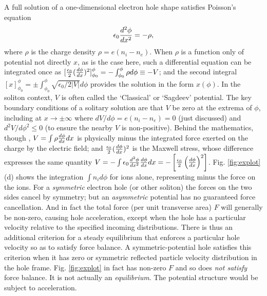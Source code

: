 \documentclass[12pt]{article}
\begin{document}
A full solution of a one-dimensional electron hole shape satisfies
Poisson's equation
\begin{equation}
  \label{eq:poisson}
  \epsilon_0{d^2\phi\over dx^2} = -\rho,
\end{equation}
where $\rho$ is the charge density $\rho=e(n_i-n_e)$. When $\rho$ is a
function only of potential not directly $x$, as is the case here, such
a differential equation can be integrated once as
$[{\epsilon_0\over 2}({d\phi\over
  dx})^2]_{\phi_0}^\phi=-\int_{\phi_0}^\phi\rho d\phi\equiv-V$; and
the second integral
$[x]_{\phi_0}^\phi=\pm\int_{\phi_0}^\phi \sqrt{\epsilon_0/2|V|}d\phi$
provides the solution in the form $x(\phi)$. In the soliton context,
$V$ is often called the `Classical' or `Sagdeev' potential. The key
boundary conditions of a solitary solution are that $V$ be zero at the
extrema of $\phi$, including at $x\to\pm \infty$ where
$dV/d\phi=e(n_i-n_e)=0$ (just discussed) and $d^2V/d\phi^2\le 0$ (to
ensure the nearby $V$ is non-positive). Behind the mathematics, though
\cite{Andrews1971a}, $V=\int\rho{d\phi\over dx}dx$ is
physically minus the integrated force exerted on the charge by the
electric field; and ${\epsilon_0\over 2}({d\phi\over dx})^2$ is the
Maxwell stress, whose difference expresses the same quantity
$V = -\int\epsilon_0{d^2\phi\over dx^2}{d\phi\over
  dx}dx=-\left[{\epsilon_0\over2}\left(d\phi\over dx\right)^2\right]
$. Fig. \ref{fig:explot}(d) shows the integration $\int n_id\phi$ for
ions alone, representing minus the force on the ions.  For a
\emph{symmetric} electron hole (or other soliton) the forces on the
two sides cancel by symmetry; but an \emph{asymmetric} potential has
no guaranteed force cancellation. And in fact the total force (per
unit transverse area) $F$ will generally be non-zero, causing hole
acceleration, except when the hole has a particular velocity relative
to the specified incoming distributions.  There is thus an additional
criterion for a steady equilibrium that enforces a particular hole
velocity so as to satisfy force balance. A symmetric-potential hole
satisfies this criterion when it has zero or symmetric reflected
particle velocity distribution in the hole frame.
Fig. \ref{fig:explot} in fact has non-zero $F$ and so does \emph{not
  satisfy} force balance. It is not actually an
\emph{equilibrium}. The potential structure would be subject to
acceleration.
\end{document}
